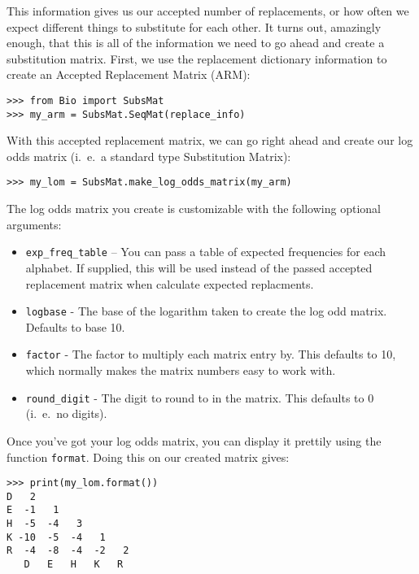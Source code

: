 This information gives us our accepted number of replacements, or how
often we expect different things to substitute for each other. It
turns out, amazingly enough, that this is all of the information we
need to go ahead and create a substitution matrix. First, we use the
replacement dictionary information to create an Accepted Replacement
Matrix (ARM):

\begin{verbatim}
>>> from Bio import SubsMat
>>> my_arm = SubsMat.SeqMat(replace_info)
\end{verbatim}

With this accepted replacement matrix, we can go right ahead and
create our log odds matrix (i.~e.~a standard type Substitution Matrix):

\begin{verbatim}
>>> my_lom = SubsMat.make_log_odds_matrix(my_arm)
\end{verbatim}

The log odds matrix you create is customizable with the following
optional arguments:

\begin{itemize}
  \item \verb|exp_freq_table| -- You can pass a table of expected
  frequencies for each alphabet. If supplied, this will be used
  instead of the passed accepted replacement matrix when calculate
  expected replacments.

  \item \verb|logbase| - The base of the logarithm taken to create the
  log odd matrix. Defaults to base 10.

  \item \verb|factor| - The factor to multiply each matrix entry
  by. This defaults to 10, which normally makes the matrix numbers
  easy to work with.

  \item \verb|round_digit| - The digit to round to in the matrix. This
  defaults to 0 (i.~e.~no digits).

\end{itemize}

Once you've got your log odds matrix, you can display it prettily
using the function \verb|format|. Doing this on our created matrix
gives:

\begin{verbatim}
>>> print(my_lom.format())
D   2
E  -1   1
H  -5  -4   3
K -10  -5  -4   1
R  -4  -8  -4  -2   2
   D   E   H   K   R
\end{verbatim}

